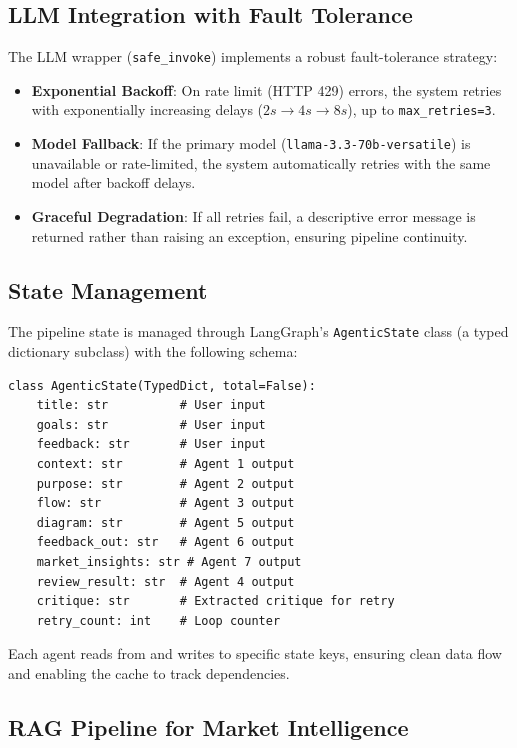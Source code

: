 \documentclass[journal]{IEEEtran}
\begin{document}
\subsection{LLM Integration with Fault Tolerance}

The LLM wrapper (\texttt{safe\_invoke}) implements a robust fault-tolerance strategy:

\begin{itemize}
    \item \textbf{Exponential Backoff}: On rate limit (HTTP 429) errors, the system retries with exponentially increasing delays ($2s \rightarrow 4s \rightarrow 8s$), up to \texttt{max\_retries=3}.
    \item \textbf{Model Fallback}: If the primary model (\texttt{llama-3.3-70b-versatile}) is unavailable or rate-limited, the system automatically retries with the same model after backoff delays.
    \item \textbf{Graceful Degradation}: If all retries fail, a descriptive error message is returned rather than raising an exception, ensuring pipeline continuity.
\end{itemize}

\subsection{State Management}

The pipeline state is managed through LangGraph's \texttt{AgenticState} class (a typed dictionary subclass) with the following schema:

\begin{lstlisting}[caption={State schema definition},label={lst:state}]
class AgenticState(TypedDict, total=False):
    title: str          # User input
    goals: str          # User input
    feedback: str       # User input
    context: str        # Agent 1 output
    purpose: str        # Agent 2 output
    flow: str           # Agent 3 output
    diagram: str        # Agent 5 output
    feedback_out: str   # Agent 6 output
    market_insights: str # Agent 7 output
    review_result: str  # Agent 4 output
    critique: str       # Extracted critique for retry
    retry_count: int    # Loop counter
\end{lstlisting}

Each agent reads from and writes to specific state keys, ensuring clean data flow and enabling the cache to track dependencies.

\subsection{RAG Pipeline for Market Intelligence}
\end{document}
